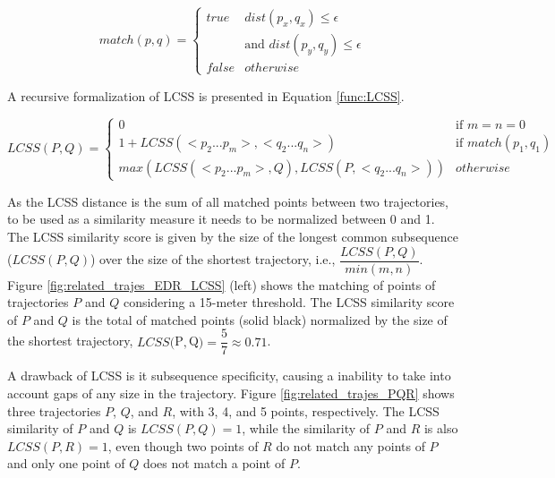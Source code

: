 \documentclass[12pt]{article}
\begin{document}

\begin{equation}
\label{func:match_LCSS}
  match(p, q) = 
  \begin{cases} 
      true & dist(p_x, q_x)  \leq \epsilon\\ 
        &            \text{and } dist(p_y, q_y)  \leq \epsilon\\
      false & otherwise
  \end{cases}
\end{equation}

A recursive formalization of LCSS is presented in Equation \ref{func:LCSS}.

\begin{equation}
\label{func:LCSS}
  LCSS(P, Q) = 
  \begin{cases} 
      0 & \text{if } m = n = 0\\ 
      1 + LCSS(<p_2...p_m>,<q_2...q_n>) & \text{if } match(p_1, q_1)\\
      max(LCSS(<p_2...p_m>, Q), LCSS(P, <q_2...q_n>)) & otherwise
  \end{cases}
\end{equation}

As the LCSS distance is the sum of all matched points between two trajectories, to be used as a similarity measure it needs to be normalized between 0 and 1. The LCSS similarity score is given by the size of the longest common subsequence ($LCSS(P, Q)$) over the size of the shortest trajectory, i.e., $\dfrac{LCSS(P, Q)}{min(m, n)}$.
Figure \ref{fig:related_trajes_EDR_LCSS} (left) shows the matching of points of trajectories $P$ and $Q$ considering a 15-meter threshold. The LCSS similarity score of $P$ and $Q$ is the total of matched points (solid black) normalized by the size of the shortest trajectory, $LCSS($P$, $Q$) = \dfrac{5}{7} \approx 0.71$.

A drawback of LCSS is it subsequence specificity, causing a inability to take into account gaps of any size in the trajectory. Figure \ref{fig:related_trajes_PQR} shows three trajectories $P$, $Q$, and $R$, with 3, 4, and 5 points, respectively. The LCSS similarity of $P$ and $Q$ is $LCSS(P, Q) = 1$, while the similarity of $P$ and $R$ is also $LCSS(P, R) = 1$, even though two points of $R$ do not match any points of $P$ and only one point of $Q$ does not match a point of $P$.
\end{document}
